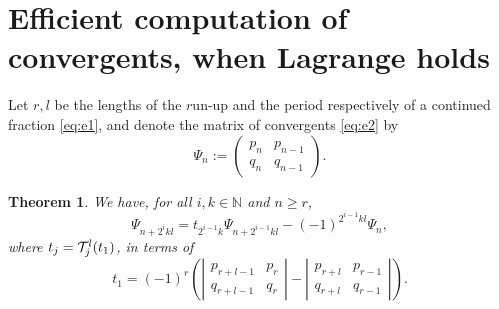 \documentclass[a4paper,fleqn]{cas-sc}
\newtheorem{theorem}{Theorem}[section]
\begin{document}
\section{Efficient computation of convergents, when Lagrange holds} \label{sec:sec3}
Let $r,l$ be the lengths of the $r$un-up and the period respectively of a continued fraction \eqref{eq:e1}, and denote the matrix of convergents \eqref{eq:e2} by 
\[
\Psi_n:=\begin{pmatrix}
p_n & p_{n-1}\\
q_n & q_{n-1}
\end{pmatrix}.
\]
\begin{theorem} \label{thm:thm4}
We have, for all $i,k\in\mathbb{N}$ and $n\geq r$, 
\begin{equation}\label{eq:dobl}
\Psi_{n+2^{i}kl}=t_{2^{i-1}k}\Psi_{n+2^{i-1}kl}-(-1)^{2^{i-1}kl}\Psi_{n},
\end{equation}
where $t_j={\cal T}_j^l(t_1)$, in terms of
\begin{equation} \label{eq:et1}
t_1=(-1)^r\left(\left|
\begin{matrix}
p_{r+l-1} & p_r \\
q_{r+l-1} & q_r 
\end{matrix}\right|-\left|\begin{matrix}
p_{r+l} & p_{r-1} \\
q_{r+l} & q_{r-1} 
\end{matrix}\right|\right).
\end{equation}
\end{theorem}
\end{document}
